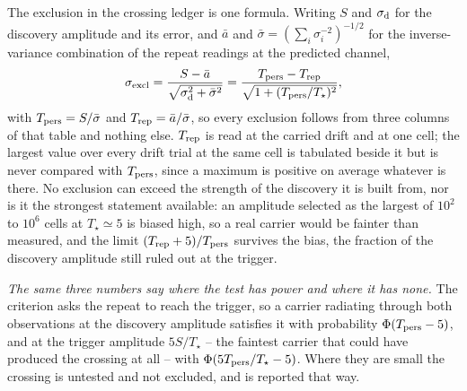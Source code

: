 The exclusion in the crossing ledger is one formula. Writing $S$ and
$\sigma_{\rm d}$ for the discovery amplitude and its error, and $\bar{a}$ and
$\bar{\sigma}=(\sum_i\sigma_i^{-2})^{-1/2}$ for the inverse-variance
combination of the repeat readings at the predicted channel,
\begin{equation}
\sigma_{\rm excl}=\frac{S-\bar{a}}
{\sqrt{\sigma_{\rm d}^{2}+\bar{\sigma}^{2}}}
=\frac{T_{\rm pers}-T_{\rm rep}}{\sqrt{1+(T_{\rm pers}/T_\star)^{2}}},
\label{eq:excl}
\end{equation}
with $T_{\rm pers}=S/\bar{\sigma}$ and $T_{\rm rep}=\bar{a}/\bar{\sigma}$, so
every exclusion follows from three columns of that table and nothing else.
$T_{\rm rep}$ is read at the carried drift and at one cell; the largest value
over every drift trial at the same cell is tabulated beside it but is never
compared with $T_{\rm pers}$, since a maximum is positive on average whatever
is there. No exclusion can exceed the strength of the discovery it is built
from, nor is it the strongest statement available: an amplitude selected as
the largest of $10^{2}$ to $10^{6}$ cells at $T_\star\simeq5$ is biased high,
so a real carrier would be fainter than measured, and the
limit $(T_{\rm rep}+5)/T_{\rm pers}$ survives the bias, the
fraction of the discovery amplitude still ruled out at the trigger.

\emph{The same three numbers say where the test has power and where it has
none.} The criterion asks the repeat to reach the trigger, so a carrier
radiating through both observations at the discovery amplitude satisfies it
with probability $\Phi(T_{\rm pers}-5)$, and at the trigger amplitude
$5S/T_\star$ -- the faintest carrier that could have produced the crossing
at all -- with $\Phi(5T_{\rm pers}/T_\star-5)$. Where they are small the
crossing is untested and not excluded, and is reported that way.

